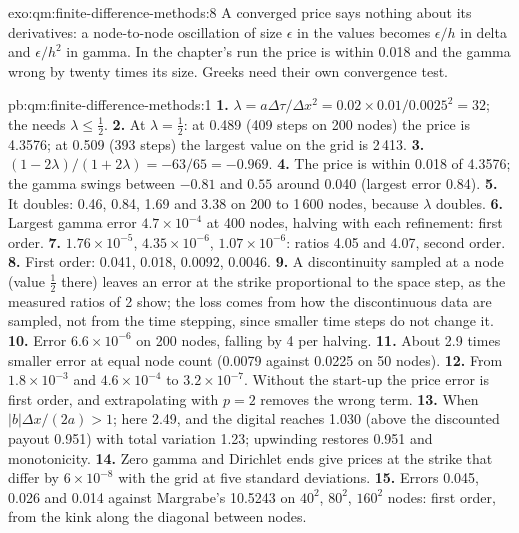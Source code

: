 \begin{solution}{exo:qm:finite-difference-methods:8}
A converged price says nothing about its derivatives: a node-to-node oscillation of size $\epsilon$ in the values becomes $\epsilon/h$ in delta and $\epsilon/h^2$ in gamma. In the chapter's run the price is within
0.018 and the gamma wrong by twenty times its size. Greeks need their own convergence test.
\end{solution}

\begin{solution}{pb:qm:finite-difference-methods:1}
\textbf{1.} $\lambda = a\Delta\tau/\Delta x^2 = 0.02 \times 0.01/0.0025^2 = 32$; the  needs $\lambda \le \frac12$.
\textbf{2.} At $\lambda = \frac12$: at 0.489 (409 steps on 200 nodes) the price is 4.3576; at 0.509 (393 steps) the largest value on the grid is 2\,413.
\textbf{3.} $(1 - 2\lambda)/(1 + 2\lambda) = -63/65 = -0.969$.
\textbf{4.} The price is within 0.018 of 4.3576; the gamma swings between $-0.81$ and $0.55$ around 0.040 (largest error 0.84).
\textbf{5.} It doubles: 0.46, 0.84, 1.69 and 3.38 on 200 to 1\,600 nodes, because $\lambda$ doubles.
\textbf{6.} Largest gamma error $4.7 \times 10^{-4}$ at 400 nodes, halving with each refinement: first order.
\textbf{7.} $1.76 \times 10^{-5}$, $4.35 \times 10^{-6}$, $1.07 \times 10^{-6}$: ratios 4.05 and 4.07, second order.
\textbf{8.} First order: 0.041, 0.018, 0.0092, 0.0046.
\textbf{9.} A discontinuity sampled at a node (value $\frac12$ there) leaves an error at the strike proportional to the space step, as the measured ratios of 2 show; the loss comes from how
the discontinuous data are sampled, not from the time stepping, since smaller time steps do not change it.
\textbf{10.} Error $6.6 \times 10^{-6}$ on 200 nodes, falling by 4 per halving.
\textbf{11.} About 2.9 times smaller error at equal node count (0.0079 against 0.0225 on 50 nodes).
\textbf{12.} From $1.8 \times 10^{-3}$ and $4.6 \times 10^{-4}$ to $3.2 \times 10^{-7}$. Without the start-up the price error is first order, and extrapolating with $p = 2$ removes the wrong term.
\textbf{13.} When $|b|\Delta x/(2a) > 1$; here 2.49, and the digital reaches 1.030 (above the discounted payout 0.951) with total variation 1.23; upwinding restores 0.951 and monotonicity.
\textbf{14.} Zero gamma and Dirichlet ends give prices at the strike that differ by $6 \times 10^{-8}$ with the grid at five standard deviations.
\textbf{15.} Errors 0.045, 0.026 and 0.014 against Margrabe's 10.5243 on $40^2$, $80^2$, $160^2$ nodes: first order, from the kink along the diagonal between nodes.

\end{solution}

